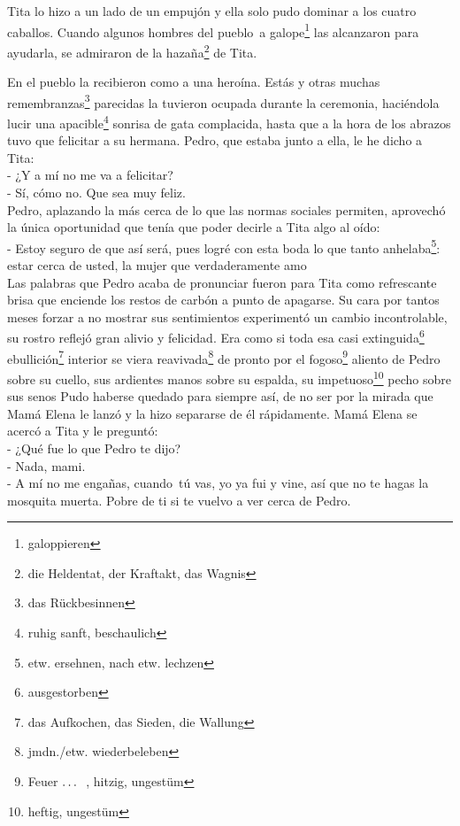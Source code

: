 Tita lo hizo a un lado de un empujón y ella solo pudo dominar a los cuatro
caballos. Cuando algunos hombres del pueblo~a galope\footnote{galoppieren}
las alcanzaron para ayudarla, se admiraron de la hazaña\footnote{die Heldentat, der Kraftakt, das Wagnis}
de Tita.

En el pueblo la recibieron como a una heroína.
Estás y otras muchas remembranzas\footnote{das Rückbesinnen}
parecidas la tuvieron ocupada durante la ceremonia, haciéndola lucir
una apacible\footnote{ruhig sanft, beschaulich} sonrisa de gata
complacida, hasta que a la hora de los abrazos tuvo que felicitar a su
hermana. Pedro, que estaba junto a ella, le he dicho a Tita:
\\- ¿Y a mí no me va a felicitar? %
\\- Sí, cómo no. Que sea muy feliz.\\

Pedro, aplazando la más cerca de lo que las normas sociales permiten,
aprovechó la única oportunidad que tenía que poder decirle a Tita algo
al oído:
\\- Estoy seguro de que así será, pues logré con esta boda lo que tanto anhelaba\footnote{etw. ersehnen, nach etw. lechzen}: estar %
cerca de usted, la mujer que verdaderamente amo \ndots\\

Las palabras que Pedro acaba de pronunciar fueron para Tita como
refrescante brisa que enciende los restos de carbón a punto de apagarse.
Su cara por tantos meses forzar a no mostrar sus sentimientos
experimentó un cambio incontrolable, su rostro reflejó gran alivio y
felicidad. Era como si toda esa casi extinguida\footnote{ausgestorben} ebullición\footnote{das Aufkochen, das Sieden, die Wallung} interior
se viera reavivada\footnote{jmdn./etw. wiederbeleben}
de pronto por el fogoso\footnote{Feuer $\ldots~$ , hitzig, ungestüm} aliento
de Pedro sobre su cuello, sus ardientes manos sobre su espalda, su impetuoso\footnote{heftig, ungestüm} pecho sobre
sus senos \ndots Pudo haberse quedado para siempre así, de no ser por la
mirada que Mamá Elena le lanzó y la hizo separarse de él rápidamente.
Mamá Elena se acercó a Tita y le preguntó:
\\- ¿Qué fue lo que Pedro te dijo? %
\\- Nada, mami. %
\\- A mí no me engañas, cuando~tú vas, yo ya fui y vine, así que no %
te hagas la mosquita muerta. Pobre de ti si te vuelvo a ver cerca de %
Pedro.\\

